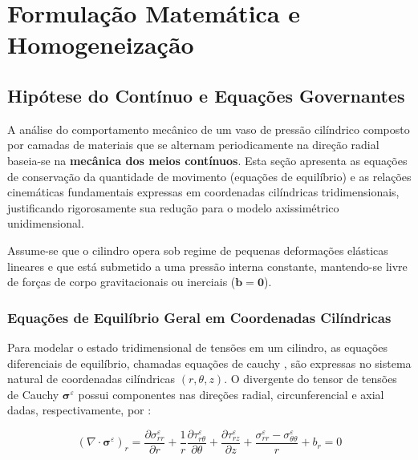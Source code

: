 \chapter{Formulação Matemática e Homogeneização} \label{sec:formulacao_matematica}

\section{Hipótese do Contínuo e Equações Governantes}

A análise do comportamento mecânico de um vaso de pressão cilíndrico composto por camadas de materiais que se alternam periodicamente na direção radial baseia-se na \textbf{mecânica dos meios contínuos}. Esta seção apresenta as equações de conservação da quantidade de movimento (equações de equilíbrio) e as relações cinemáticas fundamentais expressas em coordenadas cilíndricas tridimensionais, justificando rigorosamente sua redução para o modelo axissimétrico unidimensional.

Assume-se que o cilindro opera sob regime de pequenas deformações elásticas lineares e que está submetido a uma pressão interna constante, mantendo-se livre de forças de corpo gravitacionais ou inerciais ($\mathbf{b} = \mathbf{0}$).

\subsection{Equações de Equilíbrio Geral em Coordenadas Cilíndricas}

Para modelar o estado tridimensional de tensões em um cilindro, as equações diferenciais de equilíbrio, chamadas equações de cauchy \cite{lai2010continuum},  são expressas no sistema natural de coordenadas cilíndricas $(r, \theta, z)$. O divergente do tensor de tensões de Cauchy $\boldsymbol{\sigma}^\varepsilon$ possui componentes nas direções radial, circunferencial e axial dadas, respectivamente, por \cite{Sadd2009}:



\begin{equation}
 (\nabla \cdot \boldsymbol{\sigma}^\varepsilon)_r = \frac{\partial \sigma_{rr}^\varepsilon}{\partial r} + \frac{1}{r} \frac{\partial \tau_{r\theta}^\varepsilon}{\partial \theta} + \frac{\partial \tau_{rz}^\varepsilon}{\partial z} + \frac{\sigma_{rr}^\varepsilon - \sigma_{\theta\theta}^\varepsilon}{r} + b_r = 0
  \label{eq:equilibrium_3d_r}
\end{equation}

